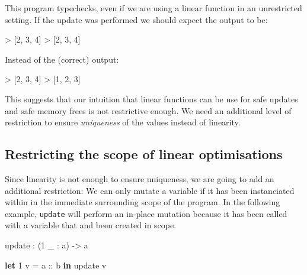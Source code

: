 \documentclass[
]{article}
\newenvironment{Shaded}{}{}
\newcommand{\DecValTok}[1]{\textcolor[rgb]{0.25,0.63,0.44}{#1}}
\newcommand{\KeywordTok}[1]{\textcolor[rgb]{0.00,0.44,0.13}{\textbf{#1}}}
\newcommand{\NormalTok}[1]{#1}
\newcommand{\OperatorTok}[1]{\textcolor[rgb]{0.40,0.40,0.40}{#1}}
\newcommand{\OtherTok}[1]{\textcolor[rgb]{0.00,0.44,0.13}{#1}}
\begin{document}
This program typechecks, even if we are using a linear function in an
unrestricted setting. If the update was performed we should expect the
output to be:

\begin{Shaded}
\begin{Highlighting}[]
\OperatorTok{\textgreater{}}\NormalTok{ [}\DecValTok{2}\NormalTok{, }\DecValTok{3}\NormalTok{, }\DecValTok{4}\NormalTok{]}
\OperatorTok{\textgreater{}}\NormalTok{ [}\DecValTok{2}\NormalTok{, }\DecValTok{3}\NormalTok{, }\DecValTok{4}\NormalTok{]}
\end{Highlighting}
\end{Shaded}

Instead of the (correct) output:

\begin{Shaded}
\begin{Highlighting}[]
\OperatorTok{\textgreater{}}\NormalTok{ [}\DecValTok{2}\NormalTok{, }\DecValTok{3}\NormalTok{, }\DecValTok{4}\NormalTok{]}
\OperatorTok{\textgreater{}}\NormalTok{ [}\DecValTok{1}\NormalTok{, }\DecValTok{2}\NormalTok{, }\DecValTok{3}\NormalTok{]}
\end{Highlighting}
\end{Shaded}

This suggests that our intuition that linear functions can be use for
safe updates and safe memory frees is not restrictive enough. We need an
additional level of restriction to ensure \emph{uniqueness} of the
values instead of linearity.

\hypertarget{restricting-the-scope-of-linear-optimisations}{%
\subsection{Restricting the scope of linear
optimisations}\label{restricting-the-scope-of-linear-optimisations}}

Since linearity is not enough to ensure uniqueness, we are going to add
an additional restriction: We can only mutate a variable if it has been
instanciated within in the immediate surrounding scope of the program.
In the following example, \texttt{update} will perform an in-place
mutation because it has been called with a variable that and been
created in scope.

\begin{Shaded}
\begin{Highlighting}[]
\NormalTok{update }\OperatorTok{:}\NormalTok{ (}\DecValTok{1}\NormalTok{ \_ }\OperatorTok{:}\NormalTok{ a) }\OtherTok{{-}\textgreater{}}\NormalTok{ a}

\KeywordTok{let} \DecValTok{1}\NormalTok{ v }\OtherTok{= a ::}\NormalTok{ b }\KeywordTok{in}
\NormalTok{    update v}
\end{Highlighting}
\end{Shaded}
\end{document}
